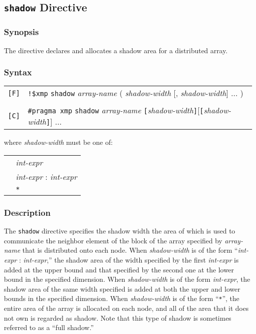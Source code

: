 \subsection{{\tt shadow} Directive}

\subsubsection*{Synopsis}

The {\tt {}} directive declares and allocates a shadow
area for a distributed array.

\subsubsection*{Syntax}

\begin{tabular}{ll}
\verb![F]! & \verb|!$xmp| {\tt shadow} {\it array-name}
( {\it shadow-width} [, {\it shadow-width}] ... ) \\
& \\
\verb![C]! & \verb|#pragma xmp|  {\tt shadow} {\it array-name}
{\tt [}{\it shadow-width}{\tt ]}[{\tt [}{\it shadow-width}{\tt ]}] ... \\
\end{tabular}
\vspace{0.3cm}

where {\it shadow-width} must be one of:

\begin{tabular}{ll}
 \hspace{0.5cm} & {\it int-expr} \\
 & {\it int-expr} : {\it int-expr}\\
 & \verb|*|\\
\end{tabular}

\subsubsection*{Description}

The {\tt shadow} directive specifies the shadow width the area of which
is used to communicate the neighbor element of the block of the array
specified by {\it array-name} that is distributed onto each node.
%
When {\it shadow-width} is of the form ``{\it int-expr} : {\it
int-expr},'' the shadow area of the width specified by the first {\it
int-expr} is added at the upper bound and that specified by the second
one at the lower bound in the specified dimension.
%
When {\it shadow-width} is of the form {\it int-expr}, the shadow
area of the same width specified is added at both the upper and lower
bounds in the specified dimension.
%
When {\it shadow-width} is of the form ``\verb|*|'', the entire area of
the array is allocated on each node, and all of the area that it does not
own is regarded as shadow.
%
Note that this type of shadow is sometimes referred to as a ``full
shadow.''

